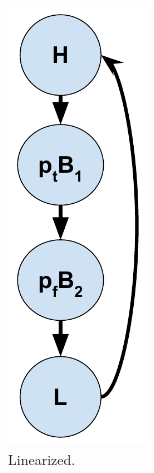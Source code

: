 \begin{figure}
\begin{subfigure}[b]{0.49\textwidth}
         \includegraphics[width=0.4\textwidth, height=.33\textheight]{Figures/02-background/simple-loop-predicated-cfg.pdf}
         \caption{Linearized.}
         \label{fig:simple-loop-predicated-cfg}
     \end{subfigure}\\
     \begin{subfigure}[b]{0.49\textwidth}
         \centering

\end{subfigure}
\end{figure}
